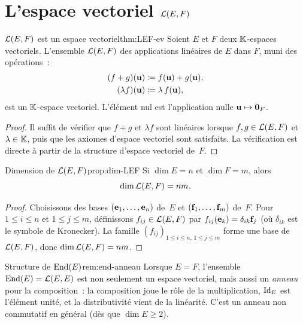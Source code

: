\section{L'espace vectoriel ${\mathcal{L}}(E,F)$}\label{sec:espace-LEF}

\begin{theorem}{${\mathcal{L}}(E,F)$ est un espace vectoriel}{thm:LEF-ev}
  Soient $E$ et $F$ deux ${\mathbb{K}}$-espaces vectoriels. L'ensemble ${\mathcal{L}}(E,F)$
  des applications linéaires de $E$ dans $F$, muni des opérations~:
  \begin{align*}
    (f+g)(\mathbf{u})&\coloneqq f(\mathbf{u})+g(\mathbf{u}),\\
    (\lambda f)(\mathbf{u})&\coloneqq\lambda\,f(\mathbf{u}),
  \end{align*}
  est un ${\mathbb{K}}$-espace vectoriel. L'élément nul est l'application nulle
  $\mathbf{u}\mapsto\mathbf{0}_F$.
\end{theorem}

\begin{proof}
  Il suffit de vérifier que $f+g$ et $\lambda f$ sont linéaires lorsque
  $f,g\in{\mathcal{L}}(E,F)$ et $\lambda\in{\mathbb{K}}$, puis que les axiomes d'espace
  vectoriel sont satisfaits. La vérification est directe à partir de la
  structure d'espace vectoriel de~$F$.
\end{proof}

\begin{proposition}{Dimension de ${\mathcal{L}}(E,F)$}{prop:dim-LEF}
  Si $\dim E=n$ et $\dim F=m$, alors
  \[
    \dim{\mathcal{L}}(E,F)=nm.
  \]
\end{proposition}

\begin{proof}
  Choisissons des bases $(\mathbf{e}_{1},\ldots,\mathbf{e}_{n})$ de~$E$ et
  $(\mathbf{f}_{1},\ldots,\mathbf{f}_{m})$ de~$F$. Pour $1\leq i\leq n$ et
  $1\leq j\leq m$, définissons $f_{ij}\in{\mathcal{L}}(E,F)$ par
  $f_{ij}(\mathbf{e}_{k})=\delta_{ik}\mathbf{f}_{j}$ (où $\delta_{ik}$ est le
  symbole de Kronecker). La famille $(f_{ij})_{1\leq i\leq n,\,1\leq j\leq m}$
  forme une base de ${\mathcal{L}}(E,F)$, donc $\dim{\mathcal{L}}(E,F)=nm$.
\end{proof}

\begin{remark}{Structure de $\operatorname{End}(E)$}{rem:end-anneau}
  Lorsque $E=F$, l'ensemble $\operatorname{End}(E)={\mathcal{L}}(E,E)$ est non seulement un
  espace vectoriel, mais aussi un \emph{anneau} pour la composition~:
  la composition joue le rôle de la multiplication, $\operatorname{Id}_E$ est l'élément
  unité, et la distributivité vient de la linéarité. C'est un anneau non
  commutatif en général (dès que $\dim E\geq 2$).
\end{remark}

